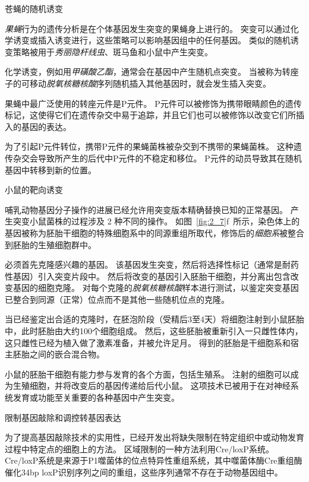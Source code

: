 \begin{proposition}[在实验动物中产生突变] \label{box:2_2}
	
	\quad \quad 苍蝇的随机诱变
	
	\quad \quad \textit{果蝇}行为的遗传分析是在个体基因发生突变的果蝇身上进行的。
	突变可以通过化学诱变或插入诱变进行，这些策略可以影响基因组中的任何基因。
	类似的随机诱变策略被用于\textit{秀丽隐杆线虫}、斑马鱼和小鼠中产生突变。
	
	\quad \quad 化学诱变，例如用\textit{甲磺酸乙酯}，通常会在基因中产生随机点突变。
	当被称为转座子的可移动\textit{脱氧核糖核酸}序列随机插入其他基因时，就会发生插入突变。
	
	\quad \quad 果蝇中最广泛使用的转座元件是P元件。
	P元件可以被修饰为携带眼睛颜色的遗传标记，这使得它们在遗传杂交中易于追踪，并且它们也可以被修饰以改变它们所插入的基因的表达。
	
	\quad \quad 为了引起P元件转位，携带P元件的果蝇菌株被杂交到不携带的果蝇菌株。
	这种遗传杂交会导致所产生的后代中P元件的不稳定和移位。
	P元件的动员导致其在随机基因中转移到新的位置。
	
	\quad \quad 小鼠的靶向诱变
	
	\quad \quad 哺乳动物基因分子操作的进展已经允许用突变版本精确替换已知的正常基因。
	产生突变小鼠菌株的过程涉及 2 种不同的操作。
	如图~\ref{fig:2_7}f~所示，染色体上的基因被称为胚胎干细胞的特殊细胞系中的同源重组所取代，修饰后的\textit{细胞系}被整合到胚胎的生殖细胞群中。
	
	\quad \quad 必须首先克隆感兴趣的基因。
	该基因发生突变，然后将选择性标记（通常是耐药性基因）引入突变片段中。
	然后将改变的基因引入胚胎干细胞，并分离出包含改变基因的细胞克隆。
	对每个克隆的\textit{脱氧核糖核酸}样本进行测试，以鉴定突变基因已整合到同源（正常）位点而不是其他一些随机位点的克隆。
	
	\quad \quad 当已经鉴定出合适的克隆时，在胚泡阶段（受精后3至4天）将细胞注射到小鼠胚胎中，此时胚胎由大约100个细胞组成。
	然后，这些胚胎被重新引入一只雌性体内，这只雌性已经为植入做了激素准备，并被允许足月。
	得到的胚胎是干细胞系和宿主胚胎之间的嵌合混合物。
	
	\quad \quad 小鼠的胚胎干细胞有能力参与发育的各个方面，包括生殖系。
	注射的细胞可以成为生殖细胞，并将改变后的基因传递给后代小鼠。
	这项技术已被用于在对神经系统发育或功能至关重要的各种基因中产生突变。
	
	\quad \quad 限制基因敲除和调控转基因表达
	
	\quad \quad 为了提高基因敲除技术的实用性，已经开发出将缺失限制在特定组织中或动物发育过程中特定点的细胞上的方法。
	区域限制的一种方法利用Cre/loxP系统。
	Cre/loxP系统是来源于P1噬菌体的位点特异性重组系统，其中噬菌体酶Cre重组酶催化34bp loxP识别序列之间的重组，这些序列通常不存在于动物基因组中。
	

\end{proposition}
